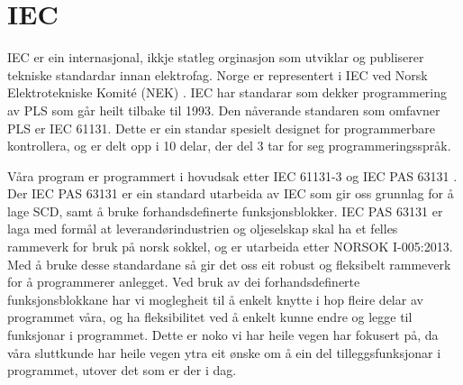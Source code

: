 \section{IEC}
\thispagestyle{fancy}

\gls{IEC} \citep{IEC} er ein internasjonal, ikkje statleg orginasjon som utviklar og publiserer tekniske standardar innan elektrofag. 
Norge er representert i IEC ved Norsk Elektrotekniske Komité (NEK) \citep{IEC-SNL}. 
IEC har standarar som dekker programmering av PLS som går heilt tilbake til 1993\citep{Wiki-93}. 
Den nåverande standaren som omfavner PLS er IEC 61131\citep{IEC-61131}. Dette er ein standar spesielt designet for programmerbare kontrollera, og er delt opp i 10 delar, der del 3 tar for seg programmeringsspråk. 

Våra program er programmert i hovudsak etter IEC 61131-3 og IEC \gls{PAS} 63131\citep{IEC-63131} . 
Der IEC PAS 63131 er ein standard utarbeida av IEC som gir oss grunnlag for å lage \gls{SCD}, samt å bruke forhandsdefinerte funksjonsblokker. 
IEC PAS 63131 er laga med formål at leverandørindustrien og oljeselskap skal ha et felles rammeverk for bruk på norsk sokkel, og er utarbeida etter NORSOK I-005:2013.
Med å bruke desse standardane så gir det oss eit robust og fleksibelt rammeverk for å programmerer anlegget. 
Ved bruk av dei forhandsdefinerte funksjonsblokkane har vi moglegheit til å enkelt knytte i hop fleire delar av programmet våra, og ha fleksibilitet ved å enkelt kunne endre og legge til funksjonar i programmet. Dette er noko vi har heile vegen har fokusert på, da våra sluttkunde har heile vegen ytra eit ønske om å ein del tilleggsfunksjonar i programmet, utover det som er der i dag. 

